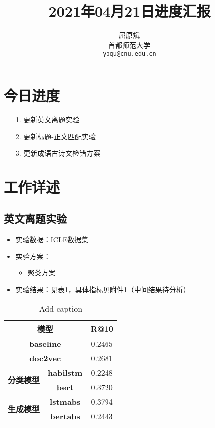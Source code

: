 \documentclass[11pt]{article}
\title{2021年04月21日进度汇报}
\author{屈原斌 \\
  首都师范大学 \\
    {\tt ybqu@cnu.edu.cn}}
\date{}
\begin{document}
\begin{CJK}{UTF8}{gkai}

\maketitle
\CJKindent


\section{今日进度}


\begin{itemize}
  \item [1.] 更新英文离题实验
  \item [2.] 更新标题-正文匹配实验
  \item [3.] 更新成语古诗文检错方案
\end{itemize}

\section{工作详述}
\subsection{英文离题实验}
\begin{itemize}
  \item 实验数据：ICLE数据集
  \item 实验方案：
  \begin{itemize}
    \item 聚类方案
  \end{itemize}
  \item 实验结果：见表1，具体指标见附件1（中间结果待分析）
\end{itemize}

\begin{table}[htbp]
  \centering
  \begin{tabular}{cc|c}
    \hline
    \multicolumn{2}{c|}{\textbf{模型}} & \textbf{R@10} \\
    \hline
    \multicolumn{2}{c|}{\textbf{baseline}} & 0.2465  \\
    \hline
    \multicolumn{2}{c|}{\textbf{doc2vec}} & 0.2681  \\
    \hline
    \multirow{2}[0]{*}{\textbf{分类模型}} & \textbf{habilstm} & 0.2248  \\
    \cline{2-3}
    & \textbf{bert} & 0.3720  \\
    \hline
    \multirow{2}[0]{*}{\textbf{生成模型}} & \textbf{lstmabs} & \textcolor[rgb]{ 1,  0,  0}{0.3794 } \\
    \cline{2-3}
    & \textbf{bertabs} & 0.2443  \\
    \hline
  \end{tabular}%
  \caption{Add caption}
  \label{tab:addlabel}%
\end{table}%


\end{CJK}
\end{document}
